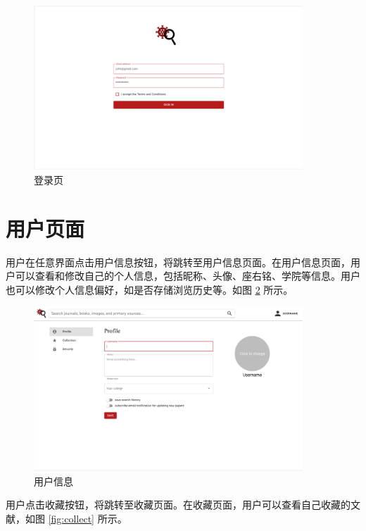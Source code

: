 \documentclass[UTF8,openany]{ctexbook}
\begin{document}
\begin{figure}[H]
\centering
\includegraphics[width=0.9\textwidth]{img/6.png}
\caption{登录页}
\label{fig:login}
\end{figure}

\section{用户页面}

用户在任意界面点击用户信息按钮，将跳转至用户信息页面。在用户信息页面，用户可以查看和修改自己的个人信息，包括昵称、头像、座右铭、学院等信息。用户也可以修改个人信息偏好，如是否存储浏览历史等。如图 \ref{fig:user-info} 所示。

\begin{figure}[H]
\centering
\includegraphics[width=0.9\textwidth]{img/8.png}
\caption{用户信息}
\label{fig:user-info}
\end{figure}

用户点击收藏按钮，将跳转至收藏页面。在收藏页面，用户可以查看自己收藏的文献，如图 \ref{fig:collect} 所示。
\end{document}
